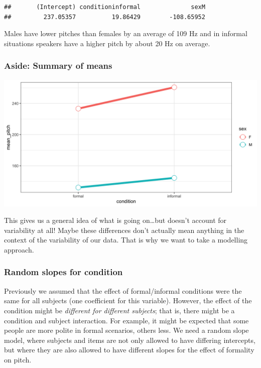 \documentclass[
  openany]{book}
\begin{document}
\begin{verbatim}
##       (Intercept) conditioninformal              sexM 
##         237.05357          19.86429        -108.65952
\end{verbatim}

Males have lower pitches than females by an average of 109 Hz and in informal situations speakers have a higher pitch by about 20 Hz on average.

\hypertarget{aside-summary-of-means}{%
\subsubsection{Aside: Summary of means}\label{aside-summary-of-means}}

\includegraphics[width=9.1\linewidth]{images/m3/aside}

This gives us a general idea of what is going on\ldots but doesn't account for variability at all! Maybe these differences don't actually mean anything in the context of the variability of our data. That is why we want to take a modelling approach.

\hypertarget{random-slopes-for-condition}{%
\subsubsection{Random slopes for condition}\label{random-slopes-for-condition}}

Previously we assumed that the effect of formal/informal conditions were the same for all subjects (one coefficient for this variable). However, the effect of the condition might be \emph{different for different subjects}; that is, there might be a condition and subject interaction. For example, it might be expected that some people are more polite in formal scenarios, others less. We need a random slope model, where subjects and items are not only allowed to have differing intercepts, but where they are also allowed to have different slopes for the effect of formality on pitch.
\end{document}

